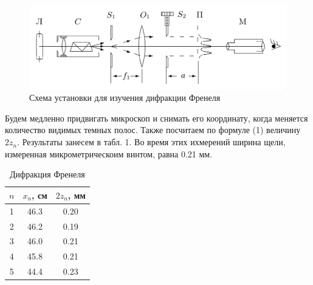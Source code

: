 \documentclass[a4paper,12pt]{article}
\begin{document}
\begin{figure}[H]
    \centering
    \includegraphics[scale=0.3]{lab_1.png}
    \caption{Схема установки для изучения дифракции Френеля}
\end{figure}

\noindent
Будем медленно придвигать микроскоп и снимать его координату, когда  меняется количество видимых темных полос. Также посчитаем по формуле (1) величину $2z_n$. Результаты занесем в табл. 1. Во время этих ихмерений ширина щели, измеренная микрометрическоим винтом, равна 0.21 мм.

\begin{table}[H]
    \centering
    \caption{Дифракция Френеля}
    \begin{tabular}{|c|c|c|} \hline
        $n$ & $x_n$, см & $2z_n$, мм \\ \hline
        1 & 46.3 & 0.20 \\ \hline
        2 & 46.2 & 0.19 \\ \hline
        3 & 46.0 & 0.21 \\ \hline
        4 & 45.8 & 0.21 \\ \hline
        5 & 44.4 & 0.23 \\ \hline
    \end{tabular}
\end{table}
\end{document}
